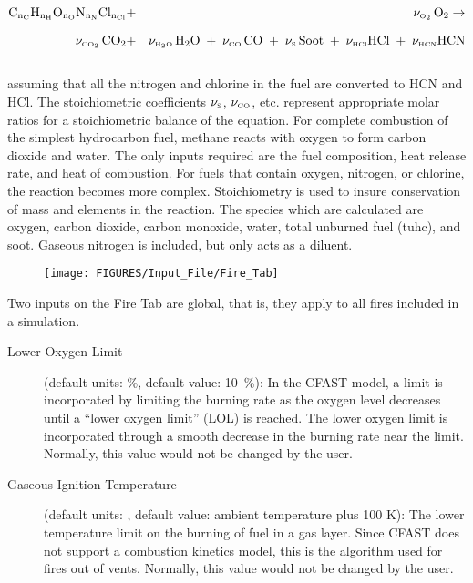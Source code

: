 \begin{eqnarray}
   \mathrm{C_{n_{\tiny \hbox{C}}}H_{n_H}O_{n_O}N_{n_N}Cl_{n_{Cl}}} &+&  \nu_{\tiny \hbox{O}_2} \, \mathrm{O_2}  \rightarrow  \nonumber \\[.1in]
   \nu_{\tiny \hbox{CO}_2} \, \mathrm{CO_2} &+& \nu_{\tiny \hbox{H}_2\hbox{O}} \, \mathrm{H_2O} \; + \; \nu_{\tiny \hbox{CO}} \, \mathrm{CO} \; + \; \nu_{\tiny \hbox{S}} \, \mathrm{Soot} \; + \; \nu_{\tiny \hbox{HCl}} \mathrm{HCl} \; + \; \nu_{\tiny \hbox{HCN}} \mathrm{HCN} \label{stoich}
\end{eqnarray} \\
assuming that all the nitrogen and chlorine in the fuel are converted to HCN and HCl. The stoichiometric coefficients $\nu_{\tiny \hbox{S}}$, $\nu_{\tiny \hbox{CO}}$, etc. represent appropriate molar ratios for a stoichiometric balance of the equation. For complete combustion of the simplest hydrocarbon fuel, methane reacts with oxygen to form carbon dioxide and water. The only inputs required are the fuel composition, heat release rate, and heat of combustion. For fuels that contain oxygen, nitrogen, or chlorine, the reaction becomes more complex. Stoichiometry is used to insure conservation of mass and elements in the reaction. The species which are calculated are oxygen, carbon dioxide, carbon monoxide, water, total unburned fuel (tuhc), and soot. Gaseous nitrogen is included, but only acts as a diluent.

\begin{figure}[h!]
\begin{center}
\texttt{[image: FIGURES/Input\_File/Fire\_Tab]}
\end{center}
\end{figure}

Two inputs on the Fire Tab are global, that is, they apply to all fires included in a simulation.
\begin{description}
\item[Lower Oxygen Limit] (default units: \%, default value: 10~\%):  In the CFAST model, a limit is incorporated by limiting the burning rate as the oxygen level decreases until a ``lower oxygen limit'' (LOL) is reached. The lower oxygen limit is incorporated through a smooth decrease in the burning rate near the limit. Normally, this value would not be changed by the user.

\item[Gaseous Ignition Temperature] (default units: \degc, default value: ambient temperature plus 100 K): The lower temperature limit on the burning of fuel in a gas layer. Since CFAST does not support a combustion kinetics model, this is the algorithm used for fires out of vents.  Normally, this value would not be changed by the user.
\end{description}

